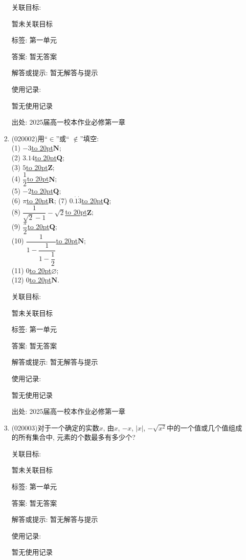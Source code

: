 \documentclass[10pt,a4paper]{article}
\newcommand{\blank}[1]{\underline{\hbox to #1pt{}}}
\begin{document}
\begin{enumerate}[1.]
关联目标:

暂未关联目标



标签: 第一单元

答案: 暂无答案

解答或提示: 暂无解答与提示

使用记录:

暂无使用记录


出处: 2025届高一校本作业必修第一章
\item { (020002)}用``$\in$''或`` $\notin$''填空:\\
(1) $-3$\blank{20}$\mathbf{N}$;\\
(2) $3.14$\blank{20}$\mathbf{Q}$;\\
(3) $5$\blank{20}$\mathbf{Z}$;\\
(4) $\dfrac 12$\blank{20}$\mathbf{N}$;\\
(5) $-2$\blank{20}$\mathbf{Q}$;\\
(6) $\pi$\blank{20}$\mathbf{R}$; 
(7) $0.\dot{1}\dot{3}$\blank{20}$\mathbf{Q}$;\\ 
(8) $\dfrac 1{\sqrt 2-1}-\sqrt 2$\blank{20}$\mathbf{Z}$;\\
(9) $\dfrac{\pi}2$\blank{20}$\mathbf{Q}$;\\
(10) $\dfrac 1{1-\dfrac 1{1-\dfrac 12}}$\blank{20}$\mathbf{N}$;\\
(11) $0$\blank{20}$\varnothing$;\\
(12) $0$\blank{20}$\mathbf{N}$.


关联目标:

暂未关联目标



标签: 第一单元

答案: 暂无答案

解答或提示: 暂无解答与提示

使用记录:

暂无使用记录


出处: 2025届高一校本作业必修第一章
\item { (020003)}对于一个确定的实数$x$, 由$x$, $-x$, $|x|$, $-\sqrt{x^2}$中的一个值或几个值组成的所有集合中, 元素的个数最多有多少个?


关联目标:

暂未关联目标



标签: 第一单元

答案: 暂无答案

解答或提示: 暂无解答与提示

使用记录:

暂无使用记录



\end{enumerate}
\end{document}
